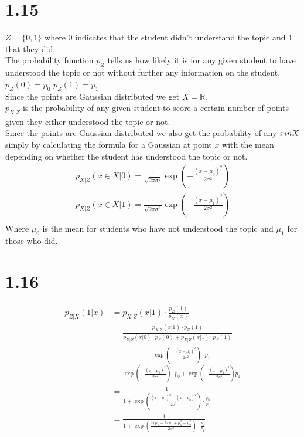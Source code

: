 \documentclass[12pt,paper=a4,twoside]{scrartcl}
\begin{document}
\section*{1.15}
     $Z = \{0,1\}$ where 0 indicates that the student didn't understand the topic and 1 that they did.\\
     The probability function $p_Z$ tells us how likely it is for any given student to have understood the topic or not without further any information on the student.\\ 
     $p_Z(0) = p_0$ $p_Z(1) = p_1$\\  
     Since the points are Gaussian distributed we get $X = \mathbb{R}$. \\ 
     $p_{X|Z}$ is the probability of any given student to score a certain number of points given they either understood the topic or not.\\ 
     Since the points are Gaussian distributed we also get the probability of any $x \\in X$ simply by calculating the formula for a Gaussian at point $x$ with the mean depending on whether the student has understood the topic or not.\\ 
     \begin{gather*}     
     p_{X|Z}(x \in X|0) = \frac{1}{\sqrt{2\pi\sigma^2}} \exp\left(-\frac{(x - \mu_0)^2}{2\sigma^2}\right)\\     
     p_{X|Z}(x \in X|1) = \frac{1}{\sqrt{2\pi\sigma^2}} \exp\left(-\frac{(x - \mu_1)^2}{2\sigma^2}\right)\\ 
     \end{gather*} 
     Where $\mu_0$ is the mean for students who have not understood the topic and $\mu_1$ for those who did.                           

\section*{1.16}
\begin{align*}
p_{Z|X}(1|x) &= p_{X|Z}(x|1) \cdot \frac{p_Z(1)}{p_X(x)}\\
&= \frac{p_{X|Z}(x|1) \cdot p_Z(1)}{p_{X|Z}(x|0) \cdot p_Z(0) + p_{X|Z}(x|1) \cdot p_Z(1)}\\
&= \frac{\exp\left(-\frac{(x - \mu_1)^2}{2\sigma^2}\right) \cdot p_1}{\exp\left(-\frac{(x - \mu_0)^2}{2\sigma^2}\right) \cdot p_0 + \exp\left(-\frac{(x - \mu_1)^2}{2\sigma^2}\right) p_1}\\
&= \frac{1}{1 + \exp\left(\frac{(x-\mu_1)^2 - (x-\mu_0)^2}{2\sigma^2}\right)\cdot\frac{p_0}{p_1}}\\
&= \frac{1}{1 + \exp\left(\frac{2x\mu_0 - 2x\mu_1 + \mu_1^2 - \mu_0^2}{2\sigma^2}\right)\cdot\frac{p_0}{p_1}}
\end{align*}
\end{document}
